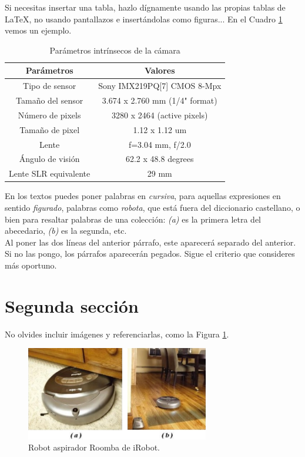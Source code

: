 Si necesitas insertar una tabla, hazlo dígnamente usando las propias tablas de \LaTeX, no usando pantallazos e insertándolas como figuras... En el Cuadro \ref{cuadro:ejemplo} vemos un ejemplo.

\begin{table}[H]
\begin{center}
\begin{tabular}{|c|c|}
\hline
\textbf{Parámetros} & \textbf{Valores} \\
\hline
Tipo de sensor & Sony IMX219PQ[7] CMOS 8-Mpx \\
Tamaño del sensor & 3.674 x 2.760 mm (1/4" format) \\
Número de pixels & 3280 x 2464 (active pixels) \\
Tamaño de pixel & 1.12 x 1.12 um \\
Lente & f=3.04 mm, f/2.0 \\
Ángulo de visión & 62.2 x 48.8 degrees \\
Lente SLR equivalente & 29 mm \\
\hline
\end{tabular}
\caption{Parámetros intrínsecos de la cámara}
\label{cuadro:ejemplo}
\end{center}
\end{table}

En los textos puedes poner palabras en \textit{cursiva}, para aquellas expresiones en sentido \textit{figurado}, palabras como \textit{robota}, que está fuera del diccionario castellano, o bien para resaltar palabras de una colección: \textit{(a)} es la primera letra del abecedario, \textit{(b)} es la segunda, etc.\\

Al poner las dos líneas del anterior párrafo, este aparecerá separado del anterior. Si no las pongo, los párrafos aparecerán pegados. Sigue el criterio que consideres más oportuno.

\section{Segunda sección}
\label{sec:segundaseccion}

No olvides incluir imágenes y referenciarlas, como la Figura \ref{fig:roomba}.

\begin{figure} [h!]
	\begin{center}
		\includegraphics[width=8cm]{figs/roomba}
	\end{center}
	\caption{Robot aspirador Roomba de iRobot.}
	\label{fig:roomba}
\end{figure}\

